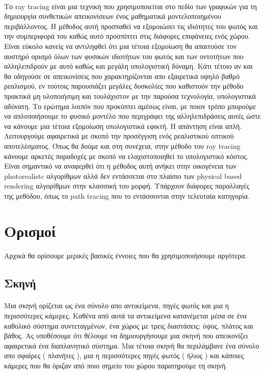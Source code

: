 \begin{sloppypar}
\paragraph{}
	Το ray tracing είναι μια τεχνική που χρησιμοποιείται στο πεδίο των γραφικών για τη
δημιουργία συνθετικών απεικονίσεων ένος μαθηματικά μοντελοποιημένου περιβάλλοντος. Η μέθοδος
αυτή προσπαθεί να εξομοιώσει τις ιδιότητες του φωτός και την συμπεριφορά του καθώς αυτό προσπίπτει
στις διάφορες επιφάνειες ενός χώρου. Είναι εύκολο κανείς να αντιληφθεί ότι μια τέτοια εξομοίωση θα
απαιτούσε τον αυστηρό ορισμό όλων των φυσικών ιδιοτήτων του φωτός και των οντοτήτων που αλληλεπιδρούν
με αυτό καθώς και μεγάλη υπολογιστική δύναμη. Κάτι τέτοιο αν και θα οδηγούσε σε απεικονίσεις που 
χαρακτηρίζονται απο εξαιρετικά υψηλό βαθμό ρεαλισμού, εν τούτοις παρουσιάζει μεγάλες δυσκολίες που 
καθιστούν την μέθοδο πρακτικά μη υλοποιήσιμη και τουλάχιστον με την παρούσα τεχνολογία, 
υπολογιστικά αδύνατη. Το ερώτημα λοιπόν που προκύπτει αμέσως είναι, με ποιον τρόπο μπορούμε να 
απλοποιήσουμε το φυσικό μοντέλο που περιγράφει της αλληλεπιδράσεις αυτές ώστε να κάνουμε μια τέτοια 
εξομοίωση υπολογιστικά εφικτή. Η απάντηση είναι απλή. Λειτουργούμε αφαιρετικά με σκοπό την προσέγγιση 
ενός ρεαλιστικού οπτικού αποτελέσματος. Όπως θα δούμε και στη συνέχεια, στην μέθοδο του ray tracing 
κάνουμε αρκετές παραδοχές με σκοπό να ελαχιστοποιηθεί το υπολογιστικό κόστος. Είναι σημαντικό να
αναφερθεί ότι η μέθοδος αυτή ανήκει στην οικογένεια των photorealistc αλγορίθμων αλλά δεν εντάσσεται 
στο πλαίσιο των physical based rendering αλγορίθμων στην κλασσική του μορφή. Υπάρχουν διάφορες 
παραλλαγές της μεθόδου, όπως το path tracing που το εντάσσονται στην τελευταία κατηγορία.

\section{Ορισμοί}
\paragraph{}
	Αρχικά θα ορίσουμε μερικές βασικές έννοιες που θα χρησιμοποιήσουμε αργότερα.

\subsection{Σκηνή}
\paragraph{}
	Μια σκηνή ορίζεται ως ένα σύνολο απο αντικείμενα, πηγές φωτός και μια η περισσότερες κάμερες.
Καθένα από αυτά τα αντικείμενα κατανέμεται μέσα σε ένα καθολικό σύστημα συντεταγμένων, ένα χώρος με 
τρεις διαστάσεις: ύψος, πλάτος και βάθος. Ας υποθέσουμε ότι θέλουμε να δημιουργήσουμε μια σκηνή που 
απεικονίζει αφαιρετικά ένα διαπλανητικό σύστημα. Μια τέτοια σκηνή θα περιλάμβανε ένα σύνολο απο 
σφαίρες ( πλανήτες ), μια η περισσότερες πηγές φωτός ( ήλιος ) και κάποιες κάμερες που θα όριζαν 
από ποιο σημείο του χώρου παρατηρούμε τη σκηνή.


\end{sloppypar}
